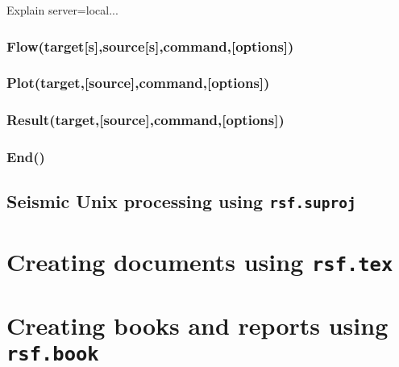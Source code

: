 Explain server=local...

\subsubsection{Flow(target[s],source[s],command,[options])}
\subsubsection{Plot(target,[source],command,[options])}
\subsubsection{Result(target,[source],command,[options])}
\subsubsection{End()}

\subsection{Seismic Unix processing using  \texttt{rsf.suproj}}

\section{Creating documents using \texttt{rsf.tex}}

\section{Creating books and reports using \texttt{rsf.book}}



